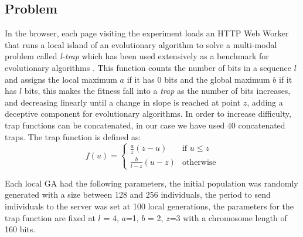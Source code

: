 \documentclass{llncs}
\begin{document}
\subsection{Problem}
In the browser, each page visiting the experiment loads an HTTP Web Worker
that runs a local island of an evolutionary algorithm to solve a
multi-modal problem called {\em l-trap} which has been used extensively
as a benchmark for evolutionary algorithms 
\cite{nijssen2003analysis}.
This function counts the number of bits in a sequence $l$ and assigns
the local maximum $a$ if it has 0 bits and the global maximum $b$ if it has $l$
bits, this makes the fitness fall into a {\em trap}
as the number of bits increases, and decreasing linearly until a change in slope
is reached at point $z$, adding a deceptive component for evolutionary
algorithms. In order to increase difficulty, trap functions can be
concatenated, in our case we have used $40$ concatenated traps. The trap
function is defined as:
\[ f(u)=
    \begin{cases}
      \frac{a}{z}(z-u) & \text{if } u\leq z\\
      \frac{b}{l-z} (u-z)& \text{otherwise}
   \end{cases}
 \]


Each local GA had the following parameters, the initial population was randomly 
generated with a size between 128 and 256 individuals, the period to send individuals to the server was set at 100 local generations, the parameters for the trap function are fixed at $l$ = 4,
$a$=1, $b$ = 2, $z$=3 with a chromosome length of 160 bits.
\end{document}
